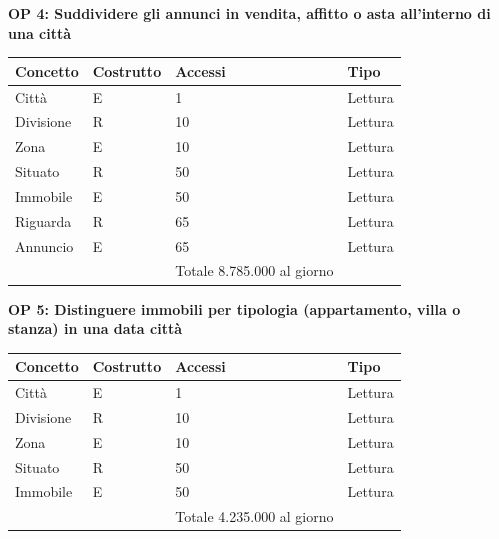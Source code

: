 \documentclass[a4paper,12pt]{report}
\begin{document}
            \textbf{OP 4: Suddividere gli annunci in vendita, affitto o asta all’interno di una città}
        	\begin{table}[H]
            \centering
             \begin{tabular}{||l l l l||}
             \hline
             Concetto & Costrutto & Accessi & Tipo \\ [0.5ex] 
             \hline\hline
             Città & E & 1 & Lettura \\ 
             Divisione & R & 10 & Lettura \\ 
             Zona & E & 10 & Lettura \\ 
             Situato & R & 50 & Lettura \\ 
             Immobile & E & 50 & Lettura \\ 
             Riguarda & R & 65 & Lettura \\ 
             Annuncio & E & 65 & Lettura \\ 
             \hline
                &   & Totale  8.785.000 al giorno &  \\ [1ex] 
             \hline
             \end{tabular}
            \end{table}

            \textbf{OP 5: Distinguere immobili per tipologia (appartamento, villa o stanza) in una data città}
        	\begin{table}[H]
            \centering
             \begin{tabular}{||l l l l||}
             \hline
             Concetto & Costrutto & Accessi & Tipo \\ [0.5ex] 
             \hline\hline
             Città & E & 1 & Lettura \\ 
             Divisione & R & 10 & Lettura \\ 
             Zona & E & 10 & Lettura \\ 
             Situato & R & 50 & Lettura \\ 
             Immobile & E & 50 & Lettura \\
             \hline
                &   & Totale  4.235.000 al giorno &  \\ [1ex] 
             \hline
             \end{tabular}
            \end{table}
\end{document}
